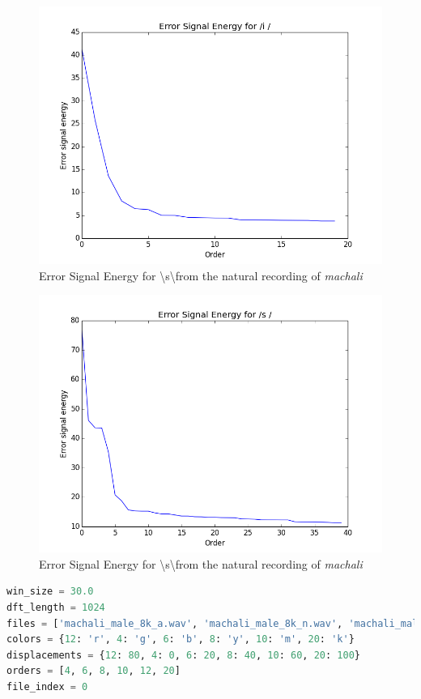 \documentclass[a4paper]{article}
\begin{document}
\begin{figure}[h!]
    \includegraphics[width=\linewidth]{./images/error_energy_i.png}
    \caption{Error Signal Energy for \textbackslash s\textbackslash from the natural recording of \textit{machali}}
    \label{fig:1}
\end{figure}


\begin{figure}[h!]
    \includegraphics[width=\linewidth]{./images/error_energy_s.png}
    \caption{ Error Signal Energy for \textbackslash s\textbackslash from the natural recording of \textit{machali}}
    \label{fig:1}
\end{figure}


\begin{lstlisting}[language=Python, caption=hparams.py]
win_size = 30.0
dft_length = 1024
files = ['machali_male_8k_a.wav', 'machali_male_8k_n.wav', 'machali_male_8k_i.wav', 'machali_male_16k_s.wav']
colors = {12: 'r', 4: 'g', 6: 'b', 8: 'y', 10: 'm', 20: 'k'}
displacements = {12: 80, 4: 0, 6: 20, 8: 40, 10: 60, 20: 100}
orders = [4, 6, 8, 10, 12, 20]
file_index = 0
\end{lstlisting}
\end{document}
